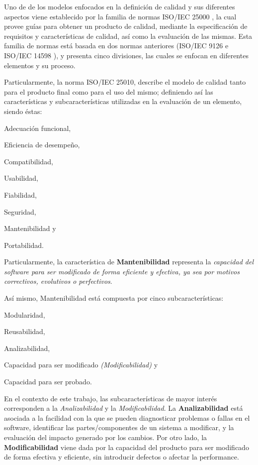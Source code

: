 Uno de de los modelos enfocados en la definición de calidad y sus diferentes aspectos
viene establecido por la familia de normas ISO/IEC 25000 \cite{ref}, 
la cual provee guías para obtener un producto de calidad, mediante la especificación 
de requisitos y características de calidad, así como la evaluación de las mismas.
Esta familia de normas está basada en dos normas anteriores (ISO/IEC 9126 \cite{ref}
e ISO/IEC 14598 \cite{ref}), y presenta cinco divisiones, las cuales se enfocan en diferentes
elementos y su proceso.

Particularmente, la norma ISO/IEC 25010, describe el modelo de calidad tanto para el producto
final como para el uso del mismo; definiendo así las características y subcaracterísticas
utilizadas en la evaluación de un elemento, siendo éstas:
\begin{inparaenum}[(1)]
    \item Adecuación funcional,
    \item Eficiencia de desempeño,
    \item Compatibilidad,
    \item Usabilidad,
    \item Fiabilidad,
    \item Seguridad,
    \item Mantenibilidad y
    \item Portabilidad.
\end{inparaenum}
Particularmente, la característica de \textbf{Mantenibilidad} representa la \textit{capacidad del
software para ser modificado de forma eficiente y efectiva, ya sea por motivos correctivos,
evolutivos o perfectivos}.

Así mismo, Mantenibilidad está compuesta por cinco subcaracterísticas:
\begin{inparaenum}[(a)]
    \item Modularidad,
    \item Reusabilidad,
    \item Analizabilidad,
    \item Capacidad para ser modificado \textit{(Modificabilidad)} y
    \item Capacidad para ser probado.
\end{inparaenum}
En el contexto de este trabajo, las subcaracterísticas de mayor interés corresponden
a la \textit{Analizabilidad} y la \textit{Modificabilidad}.
La \textbf{Analizabilidad} está asociada a la facilidad con la que se pueden diagnosticar problemas
o fallas en el software, identificar las partes/componentes de un sistema a modificar, y la
evaluación del impacto generado por los cambios.
Por otro lado, la \textbf{Modificabilidad} viene dada por la capacidad del producto para ser
modificado de forma efectiva y eficiente, sin introducir defectos o afectar la performance.

